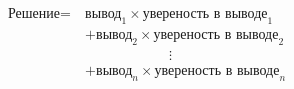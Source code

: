 \documentclass[preview]{standalone}
\begin{document}
\begin{align*}
\text{Решение}=\  &\text{вывод}_1 \times \text{увереность в выводе}_1\\ &+\text{вывод}_2 \times \text{увереность в выводе}_2\\ &\qquad\qquad\qquad\vdots\\ &+\text{вывод}_n \times \text{увереность в выводе}_n\\
\end{align*}
\end{document}
